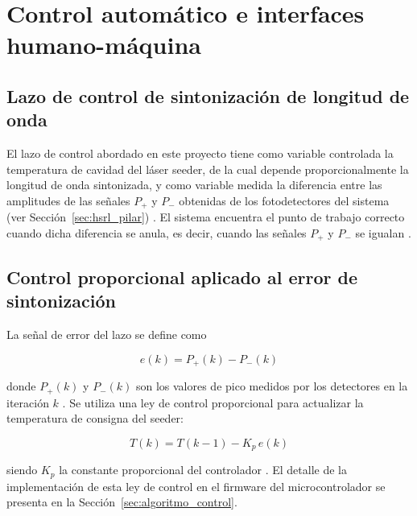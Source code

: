 \chapter{Control autom\'atico e interfaces humano-m\'aquina}
\label{cap:control_hmi}

\section{Lazo de control de sintonizaci\'on de longitud de onda}
\label{sec:lazo_control}

El lazo de control abordado en este proyecto tiene como variable
controlada la temperatura de cavidad del l\'aser seeder, de la cual
depende proporcionalmente la longitud de onda sintonizada, y como
variable medida la diferencia entre las amplitudes de las se\~nales
$P_+$ y $P_-$ obtenidas de los fotodetectores del sistema (ver
Secci\'on~\ref{sec:hsrl_pilar}) \cite{sat2026}. El sistema encuentra el
punto de trabajo correcto cuando dicha diferencia se anula, es decir,
cuando las se\~nales $P_+$ y $P_-$ se igualan \cite{sat2026}.

\section{Control proporcional aplicado al error de sintonizaci\'on}
\label{sec:control_proporcional}

La se\~nal de error del lazo se define como

\begin{equation}
  e(k) = P_+(k) - P_-(k)
  \label{eq:error_control}
\end{equation}

\noindent donde $P_+(k)$ y $P_-(k)$ son los valores de pico medidos por
los detectores en la iteraci\'on $k$ \cite{informeMarzo2026}. Se
utiliza una ley de control proporcional para actualizar la temperatura
de consigna del seeder:

\begin{equation}
  T(k) = T(k-1) - K_p \, e(k)
  \label{eq:ley_control}
\end{equation}

\noindent siendo $K_p$ la constante proporcional del controlador
\cite{informeMarzo2026}. El detalle de la implementaci\'on de esta ley
de control en el firmware del microcontrolador se presenta en la
Secci\'on~\ref{sec:algoritmo_control}.

